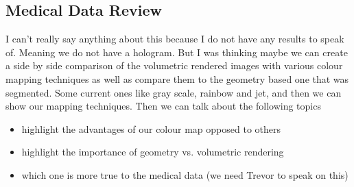 \subsection{Medical Data Review}
I can't really say anything about this because I do not have any results to speak of.  Meaning we do not have a hologram.  But I was thinking maybe we can create a side by side comparison of the volumetric rendered images with various colour mapping techniques as well as compare them to the geometry based one that was segmented.  Some current ones like gray scale, rainbow and jet, and then we can show our mapping techniques. Then we can talk about the following topics
\begin{itemize}
    \item highlight the advantages of our colour map opposed to others
    \item highlight the importance of geometry vs. volumetric rendering
    \item which one is more true to the medical data (we need Trevor to speak on this)
\end{itemize}
